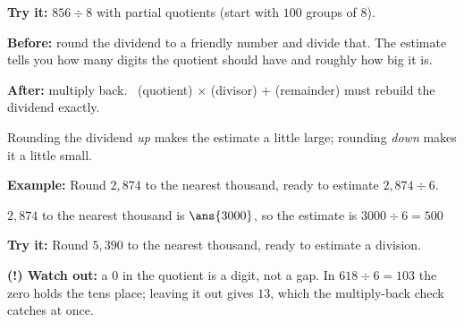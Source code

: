 \documentclass[12pt]{article}
\begin{document}
\begin{tryitbox}
\textbf{Try it:} \quad $856 \div 8$ with partial quotients (start with $100$ groups of $8$).\\[2pt]
\end{tryitbox}


\begin{formulabox}
\textbf{Before:} round the dividend to a friendly number and divide that. The estimate tells you how
many digits the quotient should have and roughly how big it is.\par
\textbf{After:} multiply back. \ (quotient) $\times$ (divisor) $+$ (remainder) must rebuild the
dividend exactly.\par
Rounding the dividend \emph{up} makes the estimate a little large; rounding \emph{down} makes it a
little small.
\end{formulabox}

\begin{examplebox}
\textbf{Example:} \quad Round $2{,}874$ to the nearest thousand, ready to estimate $2{,}874 \div 6$.

$2{,}874$ to the nearest thousand is $\ans{3000}$, so the estimate is $3000 \div 6 = 500$
\end{examplebox}

\begin{tryitbox}
\textbf{Try it:} \quad Round $5{,}390$ to the nearest thousand, ready to estimate a division.\\[2pt]
\end{tryitbox}

\begin{watchoutbox}
\textbf{(!) Watch out:} a $0$ in the quotient is a digit, not a gap. In $618 \div 6 = 103$ the zero
holds the tens place; leaving it out gives $13$, which the multiply-back check catches at once.
\end{watchoutbox}
\end{document}
